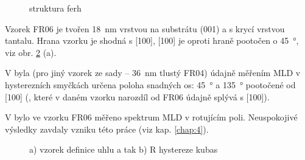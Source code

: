 \begin{figure}[htbp]
    \centering
    \caption{struktura ferh}
    \label{fig:ferh-struktura}
\end{figure}

Vzorek FR06 je tvořen \SI{18}{\nano\meter} vrstvou  na substrátu (001) a s krycí vrstvou tantalu.
Hrana vzorku je shodná s  [100],  [100] je oproti hraně pootočen o \SI{45}{\degree}, viz obr. \ref{fig:vzorek-ferh} (a).

V \cite{brajerLaserovaSpektroskopieMaterialu2015} byla (pro jiný vzorek ze sady -- \SI{36}{\nano\meter} tlustý FR04) údajně měřením MLD v hysterezních smyčkách určena poloha snadných os: \SI{45}{\degree} a \SI{135}{\degree} pootočené od  [100] (, které v daném vzorku narozdíl od FR06 údajně splývá s  [100]).

V \cite{kubascikMagnetooptickeStudiumAntiferomagnetickych2019} bylo ve vzorku FR06 měřeno spektrum MLD v rotujícím poli.
Neuspokojivé výsledky zavdaly vzniku této práce (viz kap. \ref{chap:4}).

\begin{figure}[htbp]
    \centering
    \caption{a) vzorek definice uhlu a tak b) R hystereze kubas}
    \label{fig:vzorek-ferh}
\end{figure}
